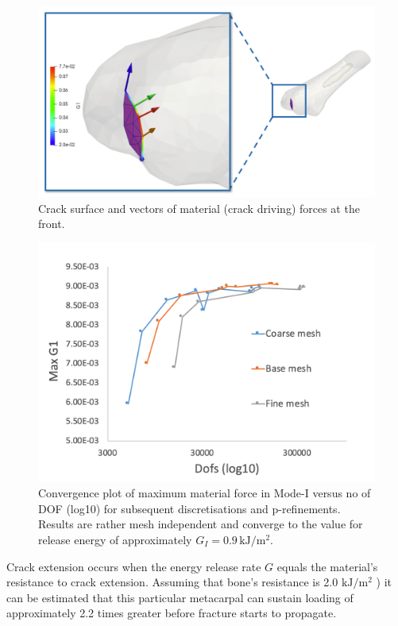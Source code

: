 \documentclass[11pt]{acmeArticle}
\numberwithin{equation}{section}
\begin{document}
\begin{figure}
	\centering
	\includegraphics[width=0.9\linewidth]{Figures/crack_front_force.png}
	\caption{Crack surface and vectors of material (crack driving) forces at the front.}
	\label{fig:crackfrontforce}
\end{figure}

\begin{figure}
	\centering
	\includegraphics[width=0.7\linewidth]{Figures/graphs/max_g1_convergece.png}
	\caption{Convergence plot of maximum material force in Mode-I versus no of DOF (log10) for subsequent discretisations and p-refinements. Results are rather mesh independent and converge to the value for release energy of approximately $ G_I = 0.9 \, \mathrm{kJ} / \mathrm{m}^2$. }
	\label{fig:max_g1_convergece}
\end{figure}
Crack extension occurs when the energy release rate $G$ equals the material's resistance to crack extension. 
Assuming that bone's resistance is 2.0 $\mathrm{ kJ/m^2}$ ) \citep{gasser2007numerical} it can be estimated that this particular metacarpal can sustain loading of approximately 2.2 times greater before fracture starts to propagate. 
\end{document}
